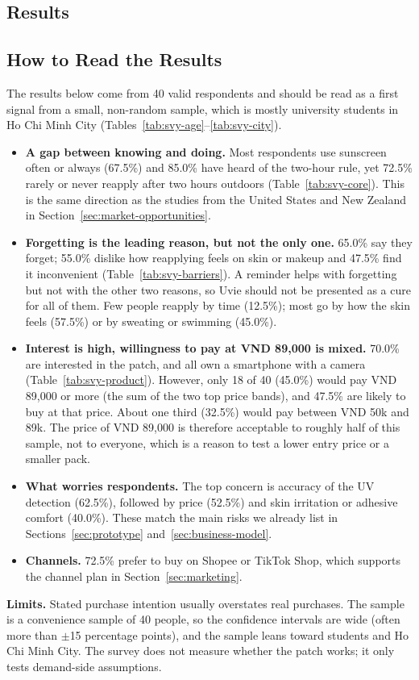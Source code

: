 \subsection{Results}


\subsection{How to Read the Results}
\noindent The results below come from 40 valid respondents and should be read as a first signal
from a small, non-random sample, which is mostly university students in Ho Chi Minh City
(Tables~\ref{tab:svy-age}--\ref{tab:svy-city}).

\begin{itemize}[itemsep=0pt]
  \item \textbf{A gap between knowing and doing.} Most respondents use sunscreen often or
    always (67.5\%) and 85.0\% have heard of the two-hour rule, yet 72.5\% rarely or never
    reapply after two hours outdoors (Table~\ref{tab:svy-core}). This is the same direction as the
    studies from the United States and New Zealand in Section~\ref{sec:market-opportunities}.
  \item \textbf{Forgetting is the leading reason, but not the only one.} 65.0\% say they forget;
    55.0\% dislike how reapplying feels on skin or makeup and 47.5\% find it inconvenient
    (Table~\ref{tab:svy-barriers}). A reminder helps with forgetting but not with the other two
    reasons, so Uvie should not be presented as a cure for all of them. Few people reapply by
    time (12.5\%); most go by how the skin feels (57.5\%) or by sweating or swimming (45.0\%).
  \item \textbf{Interest is high, willingness to pay at VND 89,000 is mixed.} 70.0\% are
    interested in the patch, and all own a smartphone with a camera (Table~\ref{tab:svy-product}).
    However, only 18 of 40 (45.0\%) would pay VND 89,000 or more (the sum of the two top price
    bands), and 47.5\% are likely to buy at that price. About one third (32.5\%) would pay between
    VND 50k and 89k. The price of VND 89,000 is therefore acceptable to roughly half of this sample,
    not to everyone, which is a reason to test a lower entry price or a smaller pack.
  \item \textbf{What worries respondents.} The top concern is accuracy of the UV detection (62.5\%),
    followed by price (52.5\%) and skin irritation or adhesive comfort (40.0\%). These match the
    main risks we already list in Sections~\ref{sec:prototype} and~\ref{sec:business-model}.
  \item \textbf{Channels.} 72.5\% prefer to buy on Shopee or TikTok Shop, which supports the
    channel plan in Section~\ref{sec:marketing}.
\end{itemize}

\noindent \textbf{Limits.} Stated purchase intention usually overstates real purchases. The sample
is a convenience sample of 40 people, so the confidence intervals are wide (often more than
$\pm$15 percentage points), and the sample leans toward students and Ho Chi Minh City. The survey
does not measure whether the patch works; it only tests demand-side assumptions.
